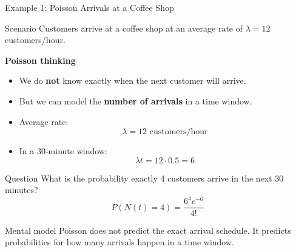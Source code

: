 \documentclass[aspectratio=169]{beamer}
\begin{document}
\begin{frame}{Example 1: Poisson Arrivals at a Coffee Shop}
\tiny

\begin{block}{Scenario}
Customers arrive at a coffee shop at an average rate of $\lambda = 12$ customers/hour.
\end{block}

\vspace{0.15cm}

\textbf{Poisson thinking}

\begin{itemize}
    \item We do \textbf{not} know exactly when the next customer will arrive.
    \item But we can model the \textbf{number of arrivals} in a time window.
    \item Average rate:
    \[
        \lambda = 12 \text{ customers/hour}
    \]
    \item In a 30-minute window:
    \[
        \lambda t = 12 \cdot 0.5 = 6
    \]
\end{itemize}

\vspace{0.1cm}

\begin{exampleblock}{Question}
What is the probability exactly 4 customers arrive in the next 30 minutes?
\[
P(N(t)=4) = \frac{6^4 e^{-6}}{4!}
\]
\end{exampleblock}

\vspace{0.1cm}

\begin{alertblock}{Mental model}
Poisson does not predict the exact arrival schedule. It predicts probabilities for how many arrivals happen in a time window.
\end{alertblock}

\end{frame}
\end{document}

